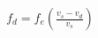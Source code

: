 \documentclass[preview]{standalone}
\begin{document}
\begin{align*}
f_d = f_e \left(\frac{v_s - v_d}{v_s}\right)
\end{align*}
\end{document}
